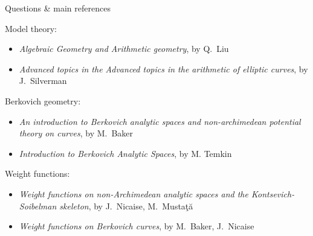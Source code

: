 \begin{frame}
	{Questions \& main references}



	
	Model theory:
	\begin{itemize}
		\item \emph{Algebraic Geometry and Arithmetic geometry}, by {Q.\ Liu}
		\item \emph{Advanced topics in the Advanced topics in the arithmetic of elliptic curves}, by {J.\ Silverman}
	\end{itemize}

	Berkovich geometry:
	\begin{itemize}
		\item \emph{An introduction to Berkovich analytic spaces and non-archimedean potential theory on curves}, by  {M.\ Baker}
		\item \emph{Introduction to Berkovich Analytic Spaces}, by {M. Temkin}
	\end{itemize}

	Weight functions:
	\begin{itemize}
		\item \emph{Weight functions on non-Archimedean analytic spaces and the Kontsevich-Soibelman skeleton}, by {J.\ Nicaise, M.\ Mustaţă}
		\item \emph{Weight functions on Berkovich curves}, by {M.\ Baker, J.\ Nicaise}
	\end{itemize}
\end{frame}
